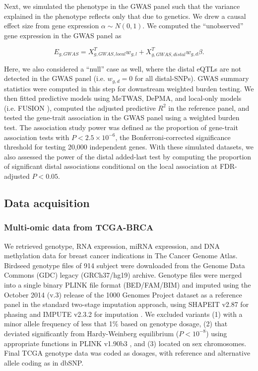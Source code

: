 Next, we simulated the phenotype
in the GWAS panel such that
the variance explained in the phenotype reflects
only that due to genetics. We drew a
causal effect size from gene expression $\alpha \sim N(0,1)$.
We computed the ``unobserved'' gene expression
in the GWAS panel as 

$$E_{g,GWAS} = X_{g,GWAS,local}^Tw_{g,l} + 
X_{g,GWAS,distal}^Tw_{g,d}\beta.$$

Here, we also considered a ``null'' case as well, where the
distal eQTLs are not detected in the GWAS panel (i.e. $w_{g,d} = 0$
for all distal-SNPs). GWAS summary statistics
were computed in this step for downstream weighted
burden testing.
We then fitted predictive models using MeTWAS, DePMA,
and local-only models (i.e. FUSION \cite{Gusev2016}),
computed the adjusted predictive $R^2$
in the reference panel, and tested
the gene-trait association in the GWAS panel
using a weighted burden test.
The association study power was defined
as the proportion of gene-trait association
tests with $P < 2.5 \times 10^{-6}$,
the Bonferroni-corrected significance threshold
for testing 20,000 independent genes.
With these simulated datasets,
we also assessed the power
of the distal added-last test
by computing the proportion
of significant distal associations
conditional on the local association
at FDR-adjusted $P < 0.05$.

\subsection{Data acquisition}

\subsubsection{Multi-omic data from TCGA-BRCA}

We retrieved genotype, RNA expression,
miRNA expression, and DNA methylation data
for breast cancer indications in The Cancer Genome Atlas.
Birdseed genotype files of 914 subject were downloaded
from the Genome Data Commons (GDC)
legacy (GRCh37/hg19) archive. Genotype
files were merged into a single binary PLINK
file format (BED/FAM/BIM) and imputed
using the October 2014 (v.3) release of the 1000 Genomes
Project dataset as a reference panel in
the standard two-stage imputation approach,
using SHAPEIT v2.87 for phasing and IMPUTE
v2.3.2 for imputation
\cite{OConnell2014,Delaneau2012,Howie2009}.
We excluded variants (1) with a minor
allele frequency of less that 1\% based on
genotype
dosage, (2) that deviated significantly from
Hardy-Weinberg equilibrium ($P < 10^{-8}$)
using appropriate functions in PLINK v1.90b3
\cite{Wigginton2005,Purcell2007}, and
(3) located on sex chromosomes.  
Final TCGA genotype data was coded as dosages,
with reference and alternative allele coding as in
dbSNP.

